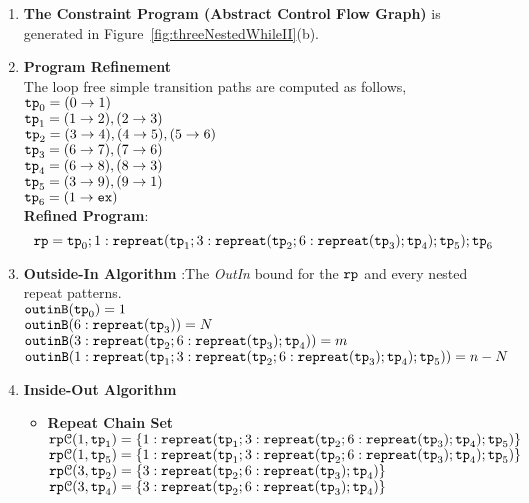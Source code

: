 \begin{enumerate}
  \item  \textbf{The Constraint Program (Abstract Control Flow Graph)} is generated in Figure~\ref{fig:threeNestedWhileII}(b).

  \item \textbf{Program Refinement}
\\
The loop free simple transition paths are computed as follows,
\\
$\mathtt{tp}_0 = (0 \to 1)$
\\
$\mathtt{tp}_1 = (1 \to 2),  (2 \to 3)$
\\
$\mathtt{tp}_2 = (3 \to 4), (4 \to 5), (5 \to 6)$
\\
$\mathtt{tp}_3 = (6 \to 7), (7 \to 6)$
\\
$\mathtt{tp}_4 = (6 \to 8), (8 \to 3)$
\\
$\mathtt{tp}_5 = (3 \to 9), (9 \to 1)$
\\
$\mathtt{tp}_6 = (1 \to \mathtt{ex})$
\\
\textbf{Refined Program}:
\[
  \mathtt{rp} = \mathtt{tp}_0 ; 1: \mathtt{repreat}(\mathtt{tp}_1; 3: \mathtt{repreat}(\mathtt{tp}_2; 6 : \mathtt{repreat}(\mathtt{tp}_3); \mathtt{tp}_4); \mathtt{tp}_5); \mathtt{tp}_6
\]
\item \textbf{Outside-In Algorithm} :The \emph{OutIn} bound for the $\mathtt{rp}$ and every nested repeat patterns.
\\
$\mathtt{outinB}(\mathtt{tp}_0) = 1$
\\
$\mathtt{outinB}(6 : \mathtt{repreat}(\mathtt{tp}_3)) = N $
\\
$\mathtt{outinB}(3: \mathtt{repreat}(\mathtt{tp}_2; 6 : \mathtt{repreat}(\mathtt{tp}_3); \mathtt{tp}_4)) = m $
\\
$\mathtt{outinB}(1: \mathtt{repreat}(\mathtt{tp}_1; 3: \mathtt{repreat}(\mathtt{tp}_2; 6 : \mathtt{repreat}(\mathtt{tp}_3); \mathtt{tp}_4); \mathtt{tp}_5)) = n - N $
\item \textbf{Inside-Out Algorithm}
\begin{itemize}
    \item \textbf{Repeat Chain Set}
    \\
    $\mathtt{rp}\mathcal{C}(1, \mathtt{tp}_1) = \{1: \mathtt{repreat}(\mathtt{tp}_1; 3: \mathtt{repreat}(\mathtt{tp}_2; 6 : \mathtt{repreat}(\mathtt{tp}_3); \mathtt{tp}_4); \mathtt{tp}_5)\}$
    \\
    $\mathtt{rp}\mathcal{C}(1, \mathtt{tp}_5) = \{1: \mathtt{repreat}(\mathtt{tp}_1; 3: \mathtt{repreat}(\mathtt{tp}_2; 6 : \mathtt{repreat}(\mathtt{tp}_3); \mathtt{tp}_4); \mathtt{tp}_5)\}$
    \\
    $\mathtt{rp}\mathcal{C}(3, \mathtt{tp}_2) = \{3: \mathtt{repreat}(\mathtt{tp}_2; 6 : \mathtt{repreat}(\mathtt{tp}_3); \mathtt{tp}_4)\}$
    \\
    $\mathtt{rp}\mathcal{C}(3, \mathtt{tp}_4) = \{3: \mathtt{repreat}(\mathtt{tp}_2; 6 : \mathtt{repreat}(\mathtt{tp}_3); \mathtt{tp}_4)\}$
    \\

\end{itemize}
\end{enumerate}
